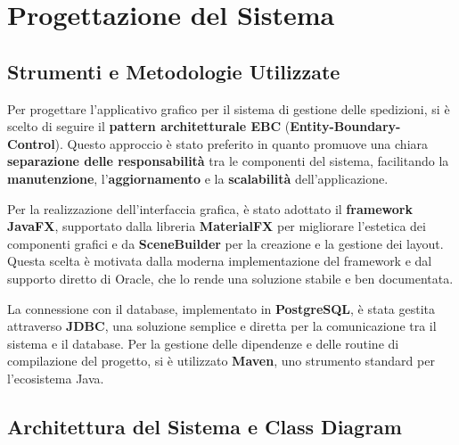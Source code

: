 \section{Progettazione del Sistema}

\subsection{Strumenti e Metodologie Utilizzate}

Per progettare l'applicativo grafico per il sistema di gestione delle spedizioni, si è scelto di seguire il \textbf{pattern architetturale EBC} (\textbf{Entity-Boundary-Control}). Questo approccio è stato preferito in quanto promuove una chiara \textbf{separazione delle responsabilità} tra le componenti del sistema, facilitando la \textbf{manutenzione}, l'\textbf{aggiornamento} e la \textbf{scalabilità} dell'applicazione.

Per la realizzazione dell'interfaccia grafica, è stato adottato il \textbf{framework JavaFX}, supportato dalla libreria \textbf{MaterialFX} per migliorare l'estetica dei componenti grafici e da \textbf{SceneBuilder} per la creazione e la gestione dei layout. Questa scelta è motivata dalla moderna implementazione del framework e dal supporto diretto di Oracle, che lo rende una soluzione stabile e ben documentata.

La connessione con il database, implementato in \textbf{PostgreSQL}, è stata gestita attraverso \textbf{JDBC}, una soluzione semplice e diretta per la comunicazione tra il sistema e il database. Per la gestione delle dipendenze e delle routine di compilazione del progetto, si è utilizzato \textbf{Maven}, uno strumento standard per l'ecosistema Java.


\subsection{Architettura del Sistema e Class Diagram}

